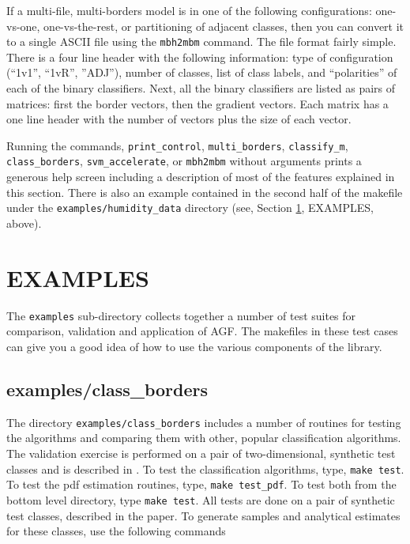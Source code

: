 \documentclass[12pt]{article}
\begin{document}
If a multi-file, multi-borders model is in one of the following configurations:
one-vs-one, one-vs-the-rest, or partitioning of adjacent classes, then you
can convert it to a single ASCII file using the \verb/mbh2mbm/ command.
The file format fairly simple. There is a four line header with the 
following information: type of configuration (``1v1'', ``1vR'', ''ADJ''),
number of classes,
list of class labels, and
``polarities'' of each of the binary classifiers.
Next, all the binary classifiers are listed as pairs of matrices: 
first the border vectors, then the gradient vectors. 
Each matrix has a one line header with the number of vectors plus the size of each vector.

Running the commands, \verb/print_control/, \verb"multi_borders", \verb"classify_m", \verb"class_borders", \verb/svm_accelerate/, or \verb/mbh2mbm/ without arguments prints a generous help screen including a description of most of the features explained in this section.  There is also an example contained in the second half of the makefile under the \verb"examples/humidity_data" directory (see, Section \ref{EXAMPLES}, EXAMPLES, above).

\section{EXAMPLES}

\label{EXAMPLES}

  The \verb"examples" sub-directory collects together a number of test suites for comparison, validation and application of AGF.  The makefiles in these test cases can give you a good idea of how to use the various components of the library.

\subsection{examples/class\_borders}

The directory \verb"examples/class_borders" includes a number of routines for testing the algorithms and comparing them with other, popular classification algorithms.  The validation exercise is performed on a pair of two-dimensional, synthetic test classes and is described in \citet{Mills2011}.  To test the classification algorithms, type, \verb"make test".  To test the pdf estimation routines, type, \verb"make test_pdf".  To test both from the bottom level directory, type \verb"make test".  All tests are done on a pair of synthetic test classes, described in the paper.  To generate samples and analytical estimates for these classes, use the following commands
\end{document}
